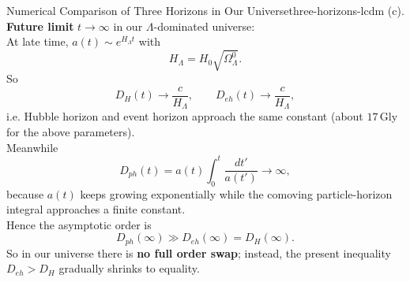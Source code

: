 \begin{example}{Numerical Comparison of Three Horizons in Our Universe}{three-horizons-lcdm}
    (c). \textbf{Future limit} $t\to\infty$ in our $\Lambda$-dominated universe: \\
    At late time, $a(t)\sim e^{H_\Lambda t}$ with
    \[
        H_\Lambda = H_0\sqrt{\Omega_\Lambda^0}.
    \]
    So
    \[
        D_H(t)\to \frac{c}{H_\Lambda},
        \qquad
        D_{eh}(t)\to \frac{c}{H_\Lambda},
    \]
    i.e. Hubble horizon and event horizon approach the same constant (about $17\,\mathrm{Gly}$ for the above parameters). \\
    Meanwhile
    \[
        D_{ph}(t)=a(t)\int_0^t\frac{dt'}{a(t')}\to\infty,
    \]
    because $a(t)$ keeps growing exponentially while the comoving particle-horizon integral approaches a finite constant. \\

    Hence the asymptotic order is
    \[
        D_{ph}(\infty)\gg D_{eh}(\infty)=D_H(\infty).
    \]
    So in our universe there is \textbf{no full order swap}; instead, the present inequality $D_{eh}>D_H$ gradually shrinks to equality.
\end{example}


